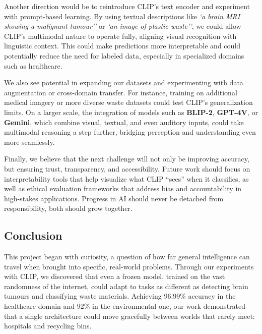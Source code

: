\documentclass[12pt]{article}
\begin{document}
Another direction would be to reintroduce CLIP’s text encoder and experiment with prompt-based learning. By using textual descriptions like \textit{`a brain MRI showing a malignant tumour''} or \textit{`an image of plastic waste''}, we could allow CLIP’s multimodal nature to operate fully, aligning visual recognition with linguistic context. This could make predictions more interpretable and could potentially reduce the need for labeled data, especially in specialized domains such as healthcare.

We also see potential in expanding our datasets and experimenting with data augmentation or cross-domain transfer. For instance, training on additional medical imagery or more diverse waste datasets could test CLIP’s generalization limits. On a larger scale, the integration of models such as \textbf{BLIP-2}, \textbf{GPT-4V}, or \textbf{Gemini}, which combine visual, textual, and even auditory inputs, could take multimodal reasoning a step further, bridging perception and understanding even more seamlessly.

Finally, we believe that the next challenge will not only be improving accuracy, but ensuring trust, transparency, and accessibility. Future work should focus on interpretability tools that help visualize what CLIP ``sees'' when it classifies, as well as ethical evaluation frameworks that address bias and accountability in high-stakes applications. Progress in AI should never be detached from responsibility, both should grow together.

\subsection{Conclusion}
This project began with curiosity, a question of how far general intelligence can travel when brought into specific, real-world problems. Through our experiments with CLIP, we discovered that even a frozen model, trained on the vast randomness of the internet, could adapt to tasks as different as detecting brain tumours and classifying waste materials. Achieving 96.99\% accuracy in the healthcare domain and 92\% in the environmental one, our work demonstrated that a single architecture could move gracefully between worlds that rarely meet: hospitals and recycling bins.
\end{document}
